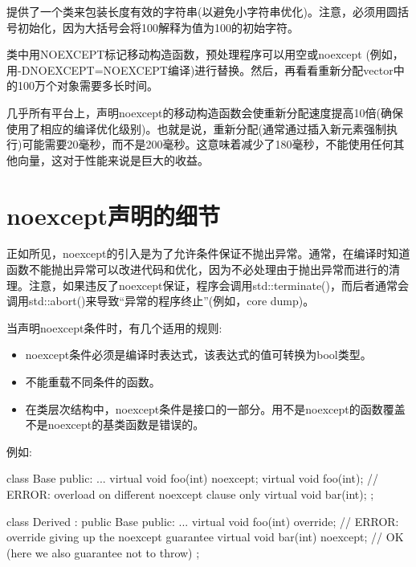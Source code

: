 提供了一个类来包装长度有效的字符串(以避免小字符串优化)。注意，必须用圆括号初始化，因为大括号会将100解释为值为100的初始字符。\par

类中用NOEXCEPT标记移动构造函数，预处理程序可以用空或noexcept (例如，用-DNOEXCEPT=NOEXCEPT编译)进行替换。然后，再看看重新分配vector中的100万个对象需要多长时间。\par

几乎所有平台上，声明noexcept的移动构造函数会使重新分配速度提高10倍(确保使用了相应的编译优化级别)。也就是说，重新分配(通常通过插入新元素强制执行)可能需要20毫秒，而不是200毫秒。这意味着减少了180毫秒，不能使用任何其他向量，这对于性能来说是巨大的收益。\par


\section{noexcept声明的细节}

正如所见，noexcept的引入是为了允许条件保证不抛出异常。通常，在编译时知道函数不能抛出异常可以改进代码和优化，因为不必处理由于抛出异常而进行的清理。注意，如果违反了noexcept保证，程序会调用std::terminate()，而后者通常会调用std::abort()来导致“异常的程序终止”(例如，core dump)。\par


当声明noexcept条件时，有几个适用的规则:\par

\begin{itemize}
  \item noexcept条件必须是编译时表达式，该表达式的值可转换为bool类型。
  \item 不能重载不同条件的函数。
  \item 在类层次结构中，noexcept条件是接口的一部分。用不是noexcept的函数覆盖不是noexcept的基类函数是错误的。
\end{itemize}

例如:\par

\begin{codebox}[cpp]
class Base {
  public:
  ...
  virtual void foo(int) noexcept;
  virtual void foo(int); // ERROR: overload on different noexcept clause only
  virtual void bar(int);
};

class Derived : public Base {
  public:
  ...
  virtual void foo(int) override; // ERROR: override giving up the noexcept guarantee
  virtual void bar(int) noexcept; // OK (here we also guarantee not to throw)
};
\end{codebox}

